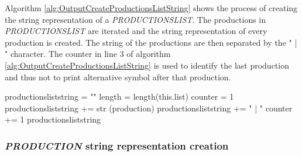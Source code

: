 Algorithm \ref{alg:OutputCreateProductionsListString} shows the process of creating the string representation of a \textit{PRODUCTIONS\textunderscore LIST}. The productions in \textit{PRODUCTIONS\textunderscore LIST} are iterated and the string representation of every production is created. The string of the productions are then separated by the " | " character. The counter in line 3 of algorithm \ref{alg:OutputCreateProductionsListString} is used to identify the last production and thus not to print alternative symbol after that production.

\begin{algorithm}[H]
\caption{\textit{PRODUCTIONS\textunderscore LIST} string creation}\label{alg:OutputCreateProductionsListString}
\begin{algorithmic}[1]
\State productions\textunderscore list\textunderscore string = ""
\State length = length(this.list)
\State counter = 1
	\State productions\textunderscore list\textunderscore string += str (production)
		\State productions\textunderscore list\textunderscore string += " | "
	\EndIf
	\State counter += 1
\EndFor
\Return productions\textunderscore list\textunderscore string
\end{algorithmic}
\end{algorithm}

\subsubsection{\textit{PRODUCTION} string representation creation}

